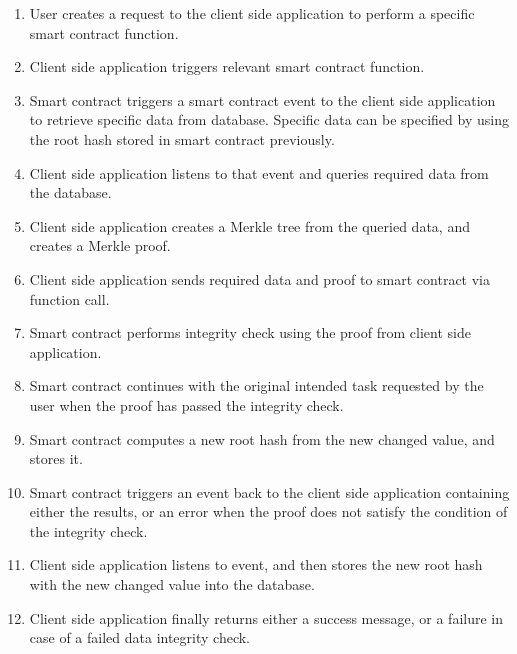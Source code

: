 \begin{enumerate}
	\item User creates a request to the client side application to perform a specific smart contract function. 
	\item Client side application triggers relevant smart contract function.
	\item Smart contract triggers a smart contract event to the client side application to retrieve specific data from database. Specific data can be specified by using the root hash stored in smart contract previously.
	\item Client side application listens to that event and queries required data from the database.
	\item Client side application creates a Merkle tree from the queried data, and creates a Merkle proof.
	\item Client side application sends required data and proof to smart contract via function call.
	\item Smart contract performs integrity check using the proof from client side application.
	\item Smart contract continues with the original intended task requested by the user when the proof has passed the integrity check. 
	\item Smart contract computes a new root hash from the new changed value, and stores it.
	\item Smart contract triggers an event back to the client side application containing either the results, or an error when the proof does not satisfy the condition of the integrity check. 
	\item Client side application listens to event, and then stores the new root hash with the new changed value into the database. 
	\item Client side application finally returns either a success message, or a failure in case of a failed data integrity check. 
\end{enumerate}

